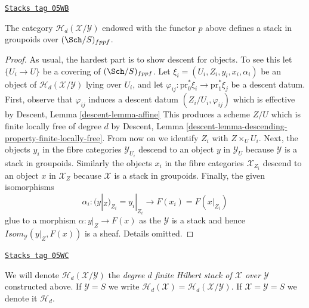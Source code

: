 \begin{lemma}
\label{examples-stacks-lemma-hilbert-d-stack}
\href{https://stacks.math.columbia.edu/tag/05WB}{\texttt{Stacks tag 05WB}}

The category $\mathcal{H}_d(\mathcal{X}/\mathcal{Y})$ endowed with
the functor $p$ above defines a stack in groupoids over
$(\Sch/S)_{fppf}$.
\end{lemma}

\begin{proof}
As usual, the hardest part is to show descent for objects.
To see this let $\{U_i \to U\}$ be a covering of $(\Sch/S)_{fppf}$.
Let $\xi_i = (U_i, Z_i, y_i, x_i, \alpha_i)$ be an object of
$\mathcal{H}_d(\mathcal{X}/\mathcal{Y})$ lying over $U_i$, and let
$\varphi_{ij} : \text{pr}_0^*\xi_i \to \text{pr}_1^*\xi_j$
be a descent datum. First, observe that $\varphi_{ij}$
induces a descent datum $(Z_i/U_i, \varphi_{ij})$ which is effective by
Descent, Lemma \ref{descent-lemma-affine}
This produces a scheme $Z/U$ which is finite locally free of degree $d$ by
Descent, Lemma \ref{descent-lemma-descending-property-finite-locally-free}.
From now on we identify $Z_i$ with $Z \times_U U_i$.
Next, the objects $y_i$ in the fibre categories $\mathcal{Y}_{U_i}$
descend to an object $y$ in $\mathcal{Y}_U$ because $\mathcal{Y}$ is a
stack in groupoids. Similarly the objects $x_i$ in the fibre categories
$\mathcal{X}_{Z_i}$ descend to an object $x$ in $\mathcal{X}_Z$ because
$\mathcal{X}$ is a stack in groupoids. Finally, the given
isomorphisms
$$
\alpha_i :
(y|_Z)_{Z_i} = y_i|_{Z_i}
\longrightarrow
F(x_i) = F(x|_{Z_i})
$$
glue to a morphism $\alpha : y|_Z \to F(x)$ as the $\mathcal{Y}$
is a stack and hence $\mathit{Isom}_\mathcal{Y}(y|_Z, F(x))$ is
a sheaf. Details omitted.
\end{proof}

\begin{definition}
\label{examples-stacks-definition-hilbert-d-stack}
\href{https://stacks.math.columbia.edu/tag/05WC}{\texttt{Stacks tag 05WC}}

We will denote $\mathcal{H}_d(\mathcal{X}/\mathcal{Y})$
the {\it degree $d$ finite Hilbert stack of $\mathcal{X}$ over $\mathcal{Y}$}
constructed above. If $\mathcal{Y} = S$ we write
$\mathcal{H}_d(\mathcal{X}) = \mathcal{H}_d(\mathcal{X}/\mathcal{Y})$.
If $\mathcal{X} = \mathcal{Y} = S$ we denote it $\mathcal{H}_d$.
\end{definition}


